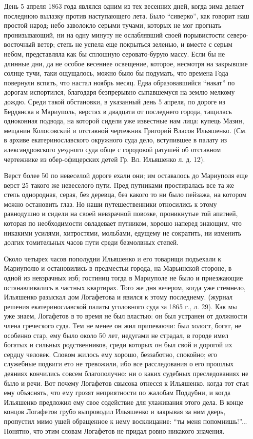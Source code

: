 \documentclass[a4paper,20pt]{article}
\begin{document}
День 5 апреля 1863 года являлся одним из тех весенних дней, когда зима делает
последнюю вылазку против наступающего лета.  Было ``сиверко'', как говорит наш
простой народ; небо заволокло серыми тучами, которых не мог прогнать
пронизывающий, ни на одну минуту не ослаблявший своей порывистости
северо-восточный ветер; степь не успела еще покрыться зеленью, и вместе с серым
небом, представляла как бы сплошную серовато-бурую массу. Если бы не длинные
дни, да не особое весеннее освещение, которое, несмотря на закрывшие солнце
тучи, таки ощущалось, можно было бы подумать, что времена Года повернули
вспять, что настал ноябрь месяц. Едва образовавшийся ``накат'' по дорогам
испортился, благодаря безпрерывно сыпавшемуся на землю мелкому дождю.  Среди
такой обстановки, в указанный день 5 апреля, по дороге из Бердянска в
Мариуполь, верстах в двадцати от последнего города, тащилась одноконная
подвода, на которой сидели уже известные нам лица: купець Мазин, мещанин
Колосовский и отставной чертежник Григорий Власов Ильяшенко. (См. в архиве
екатеринославского окружного суда дело, вступившее в палату из александровского
уездного суда обще с городовой ратушей об отставном чертежнике из
обер-офицерских детей Гр. Вл. Ильяшенко л. д. 12).

Верст более 50 по невеселой дороге ехали они; им оставалось до Мариуполя еще верст 25 такого же невеселого пути. 
Пред путниками простиралась все та же степь
однородная, серая, без деревца, без какого то ни было пейзажа, на котором можно
остановить глаз. Но наши путешественники относились к этому равнодушно и сидели
на своей невзрачной повозке, проникнутые той апатией, которая по необходимости
овладевает путником, хорошо наперед знающим, что никакими усилями, хитростями,
мольбами, едущему не сократить, ни изменить долгих томительных часов пути среди
безмолвных степей.

Около четырех часов пополудни Ильяшенко и его товарищи подъехали к Мариуполю и
остановились в предместьи города, на Марьинской стороне, в одной из невзрачных
изб; гостиниц тогда в Мариуполе не было и приезжающие останавливались в
частных квартирах. Того же дня вечером, когда уже стемнело, Ильяшенко разыскал
дом Логафетова и явился к этому последнему.
(журнал решения екатеринославской палаты уголовного суда за 1865 г., л. 29). Как мы уже знаем, Логафетов в
то время не был властью: он был устранен от должности члена греческого суда. Тем не менее он жил
припеваючи: был холост, богат, не особенно стар, ему
было около 50 лет, недугами не страдал, в городе имел
богатых и сильных родственников, среди которых он
был свой и дорогой их сердцу человек. Словом жилось
ему хорошо, беззаботно, спокойно; его служебные подвиги
ето не тревожили, ибо все расследования о его прошлых деяниях 
кончились совсем благополучно: ни о каких судебных 
преследованиях не было и речи. Вот почему Логафетов свысока отнесся к Ильяшенко, когда тот стал
ему объяснять, что ему грозят неприятности по жалобам
Поддубни, и когда Ильяшенко предложил ему свое содействие для улаживания этого дела. В конце концов
Логафетов грубо выпроводил Ильяшенко и закрывая за ним 
дверь, пропустил мимо ушей обращенное к нему восклицание: ``ты меня попомнишь!''...
Понятно, что этим словам Логафетов не придал ровно никакого значения. 
\end{document}
